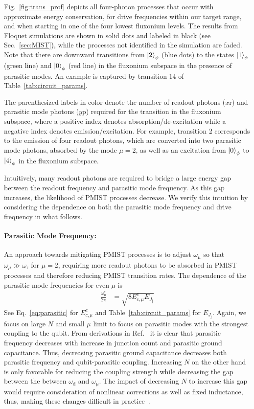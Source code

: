 \documentclass[%
reprint,
superscriptaddress,
 amsmath,amssymb,
 aps,
 prx,
longbibliography,
floatfix,
]{revtex4-2}
\begin{document}
Fig.~\ref{fig:trans_prof} depicts all four-photon processes that occur with approximate energy conservation, for drive frequencies within our target range, and when starting in one of the four lowest fluxonium levels. The results from Floquet simulations are  shown in solid dots and labeled in black (see Sec.~\ref{sec:MIST}), while the processes not identified in the simulation are faded. Note that there are downward transitions from $\ket{2}_\phi$ (blue dots) to the states $\ket{1}_\phi$ (green line) and $\ket{0}_\phi$ (red line) in the fluxonium subspace in the presence of parasitic modes. An example is captured by transition $14$ of Table~\ref{tab:circuit_params}. 

The parenthesized labels in color denote the number of readout photons ($x \mathrm{r}$) and parasitic mode photons ($y\mathrm{p}$) required for the transition in the fluxonium subspace, where a positive index denotes absorption/de-excitation while a negative index denotes emission/excitation. For example, transition $2$ corresponds to the emission of four readout photons, which are converted into two parasitic mode photons, absorbed by the mode $\mu=2$, as well as an excitation from $\ket{0}_\phi$ to $\ket{4}_\phi$ in the fluxonium subspace. 

Intuitively, many readout photons are required to bridge a large energy gap between the readout frequency and parasitic mode frequency. As this gap increases, the likelihood of PMIST processes decrease. We verify this intuition
by considering the dependence on both the parasitic mode frequency and drive frequency in what follows.  


\paragraph{Parasitic Mode Frequency:}
An approach towards mitigating PMIST processes is to adjust $\omega_\mu$ so that $\omega_\mu \gg\omega_\textrm{r}$ for $\mu=2$, requiring more readout photons to be absorbed in PMIST processes and therefore reducing PMIST transition rates. The dependence of the parasitic mode frequencies for even $\mu$ is
\begin{align}
    \frac{\omega_\mu^e}{2\pi}&=\sqrt{8E_{c,\mu}^e E_{J_\textrm{j}}}
\end{align}
 See Eq.~\ref{eq:parasitic} for $E_{c,\mu}^e$ and Table~\ref{tab:circuit_params} for $E_{J_\textrm{j}}$. Again, we focus on large $N$ and small $\mu$ limit to focus on parasitic modes with the strongest coupling to the qubit. From derivations in Ref.~\cite{viola2015collective} it is clear that parasitic frequency decreases with increase in junction count and 
 parasitic ground capacitance. Thus, decreasing parasitic ground capacitance decreases both parasitic frequency and qubit-parasitic coupling. Increasing $N$ on the other hand is only favorable for reducing the coupling strength while decreasing the gap between the between $\omega_\textrm{d}$ and $\omega_\mu$. The impact of decreasing $N$ to increase this gap would require consideration of nonlinear corrections as well as fixed inductance, thus, making these changes difficult in practice~\cite{viola2015collective}. 
\end{document}
